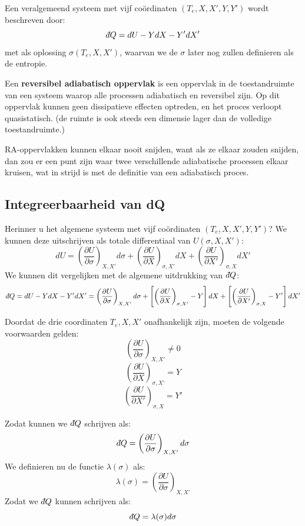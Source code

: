Een veralgemeend systeem met vijf coördinaten \((T_e, X, X', Y, Y')\) wordt beschreven door:
\[
\dbar Q = dU - YdX - Y'dX'
\]
met als oplossing \(\sigma (T_e, X, X')\), waarvan we de \(\sigma\) later nog zullen definieren als de entropie.

\begin{definition}
    Een \textbf{reversibel adiabatisch oppervlak} is een oppervlak in de toestandruimte van een systeem waarop alle processen adiabatisch en reversibel zijn. 
    Op dit oppervlak kunnen geen dissipatieve effecten optreden, en het proces verloopt quasistatisch. (de ruimte is ook steeds een dimensie lager dan de volledige toestandruimte.)
\end{definition}

RA-oppervlakken kunnen elkaar nooit snijden, want als ze elkaar zouden snijden,
dan zou er een punt zijn waar twee verschillende adiabatische processen elkaar kruisen, wat in strijd is met de definitie van een adiabatisch proces.

\subsection{Integreerbaarheid van dQ}


Herinner u het algemene systeem met vijf coördinaten \((T_e, X, X', Y, Y')\)? We kunnen deze uitschrijven als totale differentiaal van \(U(\sigma, X, X')\):
\[dU = \left(\frac{\partial U}{\partial \sigma}\right)_{X, X'} d\sigma + \left(\frac{\partial U}{\partial X}\right)_{\sigma, X'} dX + \left(\frac{\partial U}{\partial X'}\right)_{\sigma, X} dX'\]
We kunnen dit vergelijken met de algemene uitdrukking van \(\dbar Q\):
\[\dbar Q = dU - YdX - Y'dX' = \left(\frac{\partial U}{\partial \sigma}\right)_{X, X'} d\sigma + \left[\left(\frac{\partial U}{\partial X}\right)_{\sigma, X'} - Y\right] dX + \left[\left(\frac{\partial U}{\partial X'}\right)_{\sigma, X} - Y'\right] dX'\]

Doordat de drie coordinaten \(T_e, X, X'\) onafhankelijk zijn, moeten de volgende voorwaarden gelden:
\[\left(\frac{\partial U}{\partial \sigma}\right)_{X, X'} \neq 0\]
\[\left(\frac{\partial U}{\partial X}\right)_{\sigma, X'} = Y\]
\[\left(\frac{\partial U}{\partial X'}\right)_{\sigma, X} = Y'\]

Zodat kunnen we \(\dbar Q\) schrijven als:
\[\dbar Q = \left(\frac{\partial U}{\partial \sigma}\right)_{X, X'} d\sigma\]
We definieren nu de functie \(\lambda(\sigma)\) als:
\[\lambda(\sigma) = \left(\frac{\partial U}{\partial \sigma}\right)_{X, X'}\]
Zodat we \(\dbar Q\) kunnen schrijven als:
\[\dbar Q = \lambda(\sigma) d\sigma\]

